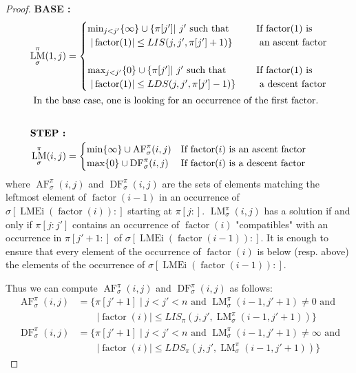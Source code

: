 \documentclass[a4paper]{llncs}
\newcommand{\ptext}{\pi}
\newcommand{\ppattern}{\sigma}
\DeclareMathOperator{\LMEi}{LMEi}
\DeclareMathOperator{\factor}{factor}
\DeclareMathOperator{\LMa}{LM}
\newcommand{\LM}[4]{\LMa_{{#1}}^{{#2}}(#3,#4)}
\DeclareMathOperator{\AFa}{AF}
\newcommand{\AF}[4]{\AFa_{{#1}}^{{#2}}(#3,#4)}
\DeclareMathOperator{\DFa}{DF}
\newcommand{\DF}[4]{\DFa_{{#1}}^{{#2}}(#3,#4)}
\begin{document}
\begin{proof}
\noindent\textbf{BASE :}
\begin{align*}
\LM{\ppattern}{\ptext}{1}{j} 
&=
\begin{cases}
		\min_{j<j'}\{\infty\} \cup \{\ptext[j'] |\text{ $j'$ such that \indent } 
			& \text{If $\factor(1)$ is}  \\
		\text{ $|\factor(1)| \leq LIS(j,j',\ptext[j']+1)  $}\}
			&\text{ an ascent factor} \\
		&\\
		\max_{j<j'}\{0\} \cup \{\ptext[j'] |\text{ $j'$ such that \indent } 
			& \text{If $\factor(1)$ is}  \\
		\text{ $|\factor(1)| \leq LDS(j,j',\ptext[j']-1) $}\}
			&\text{ a descent factor}\\
\end{cases}
\\
\intertext{
In the base case,
one is looking for an occurrence of the first factor.
}
\\
\intertext{\textbf{STEP :}}
\LM{\ppattern}{\ptext}{i}{j} 
&=
\begin{cases}
	\min \{\infty\} \cup  \AF{\ppattern}{\ptext}{i}{j} &
	\text{If $\factor(i)$ is an ascent factor}\\
	\max \{0\} \cup  \DF{\ppattern}{\ptext}{i}{j} &
	\text{If $\factor(i)$ is a descent factor}\\
\end{cases}
\end{align*}
where $\AF{\ppattern}{\ptext}{i}{j}$ and $\DF{\ppattern}{\ptext}{i}{j}$ are the sets 
of elements matching the leftmost element of $\factor(i-1)$ in an occurrence of $\sigma[\LMEi(\factor(i)):]$ starting at $\ptext[j:]$.
$\LM{\ppattern}{\ptext}{i}{j}$  has a solution
if and only if
$\ptext[j:j']$ contains an occurrence of $\factor(i)$ "compatibles" with an occurrence in $\ptext[j'+1:]$ of $\sigma[\LMEi(\factor(i-1)):]$. It is enough to ensure that every element of the occurrence of $\factor(i)$ is below (resp. above) the elements of the occurrence of $\sigma[\LMEi(\factor(i-1)):]$. 

Thus we can compute $\AF{\ppattern}{\ptext}{i}{j}$ and $\DF{\ppattern}{\ptext}{i}{j}$ as follows:
\begin{align*}
\AF{\ppattern}{\ptext}{i}{j}
&=
\text{$\{\ptext[j'+1] \;|\; j<j'<n$ and $\LM{\ppattern}{\ptext}{i-1}{j'+1} \neq 0$ and} 
\\
&\qquad 
\text{$|\factor(i)| \leq LIS_{\ptext}(j,j',\LM{\ppattern}{\ptext}{i-1}{j'+1})\}$} 
\\
\DF{\ppattern}{\ptext}{i}{j}
&=
\text{$\{\ptext[j'+1] \;|\; j<j'<n$ and $\LM{\ppattern}{\ptext}{i-1}{j'+1} \neq \infty$ and}
\\
&\qquad
\text{$|\factor(i)| \leq LDS_{\ptext}(j,j',\LM{\ppattern}{\ptext}{i-1}{j'+1})\}$}
\end{align*}


\end{proof}
\end{document}
